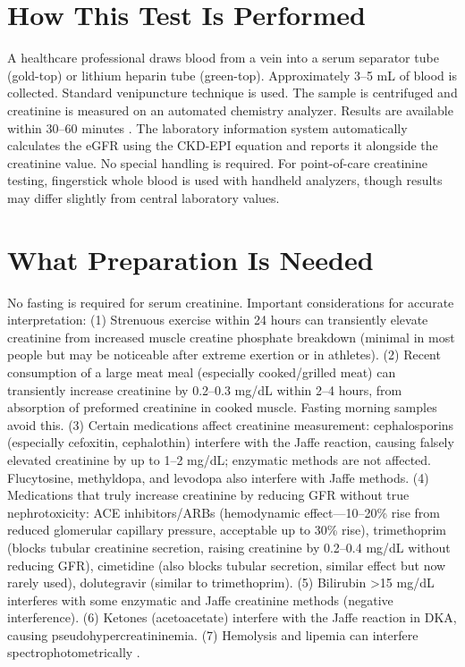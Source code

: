 \section*{How This Test Is Performed}
A healthcare professional draws blood from a vein into a serum separator tube (gold-top) or lithium heparin tube (green-top). Approximately 3--5 mL of blood is collected. Standard venipuncture technique is used. The sample is centrifuged and creatinine is measured on an automated chemistry analyzer. Results are available within 30--60 minutes \cite{tierney2023current}. The laboratory information system automatically calculates the eGFR using the CKD-EPI equation and reports it alongside the creatinine value. No special handling is required. For point-of-care creatinine testing, fingerstick whole blood is used with handheld analyzers, though results may differ slightly from central laboratory values.

\section*{What Preparation Is Needed}
No fasting is required for serum creatinine. Important considerations for accurate interpretation: (1) Strenuous exercise within 24 hours can transiently elevate creatinine from increased muscle creatine phosphate breakdown (minimal in most people but may be noticeable after extreme exertion or in athletes). (2) Recent consumption of a large meat meal (especially cooked/grilled meat) can transiently increase creatinine by 0.2--0.3 mg/dL within 2--4 hours, from absorption of preformed creatinine in cooked muscle. Fasting morning samples avoid this. (3) Certain medications affect creatinine measurement: cephalosporins (especially cefoxitin, cephalothin) interfere with the Jaffe reaction, causing falsely elevated creatinine by up to 1--2 mg/dL; enzymatic methods are not affected. Flucytosine, methyldopa, and levodopa also interfere with Jaffe methods. (4) Medications that truly increase creatinine by reducing GFR without true nephrotoxicity: ACE inhibitors/ARBs (hemodynamic effect---10--20\% rise from reduced glomerular capillary pressure, acceptable up to 30\% rise), trimethoprim (blocks tubular creatinine secretion, raising creatinine by 0.2--0.4 mg/dL without reducing GFR), cimetidine (also blocks tubular secretion, similar effect but now rarely used), dolutegravir (similar to trimethoprim). (5) Bilirubin >15 mg/dL interferes with some enzymatic and Jaffe creatinine methods (negative interference). (6) Ketones (acetoacetate) interfere with the Jaffe reaction in DKA, causing pseudohypercreatininemia. (7) Hemolysis and lipemia can interfere spectrophotometrically \cite{wallach2022interpretation}.

